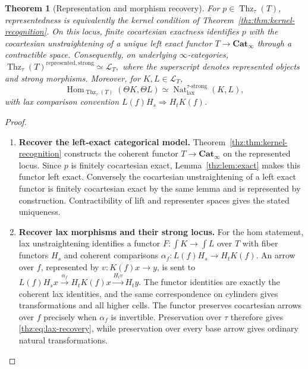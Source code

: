 \documentclass[oneside]{article}
\theoremstyle{plain}
\newtheorem{theorem}{Theorem}[section]
\theoremstyle{definition}
\theoremstyle{remark}
\newcommand{\Cat}{\mathbf{Cat}_{\infty}}
\newcommand{\Nat}{\operatorname{Nat}}
\newcommand{\Thz}{\operatorname{Thz}}
\begin{document}
\begin{theorem}[Representation and morphism recovery]\label{thz:thm:recovery}
For $p\in\Thz_\tau(T)$, representedness is equivalently the kernel
condition of Theorem~\ref{thz:thm:kernel-recognition}.  On this locus,
finite cocartesian exactness identifies $p$ with the cocartesian
unstraightening of a unique left exact functor $T\to\Cat$ through a
contractible space.  Consequently, on underlying $\infty$-categories, $\Thz_\tau(T)^{\mathrm{represented,strong}} \simeq\mathcal L_T,$ where the superscript denotes represented objects and strong morphisms.
Moreover, for $K,L\in\mathcal L_T$,
\begin{equation}\label{thz:eq:lax-recovery}
 \operatorname{Hom}_{\Thz_\tau(T)}(\Theta K,\Theta L)
 \simeq
 \Nat_{\mathrm{lax}}^{\tau\text{-strong}}(K,L),
\end{equation}
with lax comparison convention
$L(f)H_s\Rightarrow H_tK(f)$.
\end{theorem}
\begin{proof}
\leavevmode
\begin{enumerate}
\item \textbf{Recover the left-exact categorical model.} Theorem~\ref{thz:thm:kernel-recognition} constructs the coherent functor
$T\to\Cat$ on the represented locus.  Since $p$ is finitely
cocartesian exact, Lemma~\ref{thz:lem:exact} makes this functor left exact.
Conversely the cocartesian unstraightening of a left exact functor is
finitely cocartesian exact by the same lemma and is represented by
construction.  Contractibility of lift and representer spaces gives the
stated uniqueness.
\item \textbf{Recover lax morphisms and their strong locus.} For the hom statement, lax unstraightening identifies a functor
$F:\int K\to\int L$ over $T$ with fiber functors $H_s$ and coherent
comparisons $\alpha_f:L(f)H_s\longrightarrow H_tK(f).$ An arrow over $f$, represented by $v:K(f)x\to y$, is sent to $L(f)H_sx\xrightarrow{\alpha_f}H_tK(f)x \xrightarrow{H_tv}H_ty.$ The functor identities are exactly the coherent lax identities, and the same
correspondence on cylinders gives transformations and all higher cells.  The
functor preserves cocartesian arrows over $f$ precisely when $\alpha_f$ is
invertible.  Preservation over $\tau$ therefore gives
\eqref{thz:eq:lax-recovery}, while preservation over every base arrow gives
ordinary natural transformations.\cite{HHLN2023}\qedhere
\end{enumerate}
\end{proof}
\end{document}

